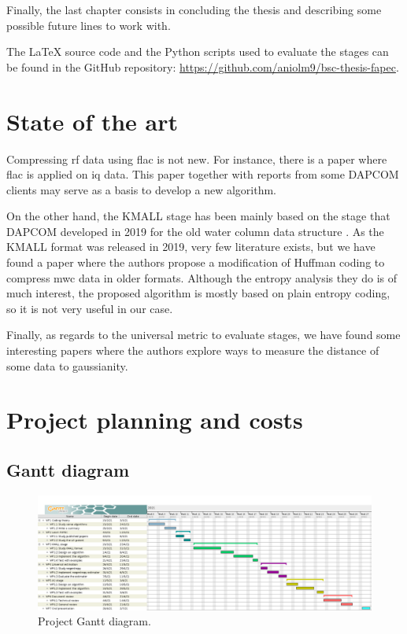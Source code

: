 Finally, the last chapter consists in concluding the thesis and describing some possible future lines to work with.

The \LaTeX{} source code and the Python scripts used to evaluate the stages can be found in the GitHub repository: \url{https://github.com/aniolm9/bsc-thesis-fapec}.

\section{State of the art}
Compressing \acrshort{rf} data using \acrshort{flac} is not new. For instance, there is a paper \parencite{IQFlac} where \acrshort{flac} is applied on \acrshort{iq} data. This paper together with reports from some DAPCOM clients may serve as a basis to develop a new algorithm.

On the other hand, the KMALL stage has been mainly based on the stage that DAPCOM developed in 2019 for the old water column data structure \parencite{Portell2019}. As the KMALL format was released in 2019, very few literature exists, but we have found a paper \parencite{MBESComp} where the authors propose a modification of Huffman coding to compress \acrshort{mwc} data in older formats. Although the entropy analysis they do is of much interest, the proposed algorithm is mostly based on plain entropy coding, so it is not very useful in our case.

Finally, as regards to the universal metric to evaluate stages, we have found some interesting papers \parencite{negentropy} \parencite{HYVARINEN2000411} where the authors explore ways to measure the distance of some data to gaussianity.

\section{Project planning and costs}
\subsection{Gantt diagram}
\begin{figure}[h!]
	\begin{center}
		\includegraphics[scale=0.255]{images/gantt.png}
	\end{center}
	\caption{Project Gantt diagram.}
	\label{fig:gantt}
\end{figure}

